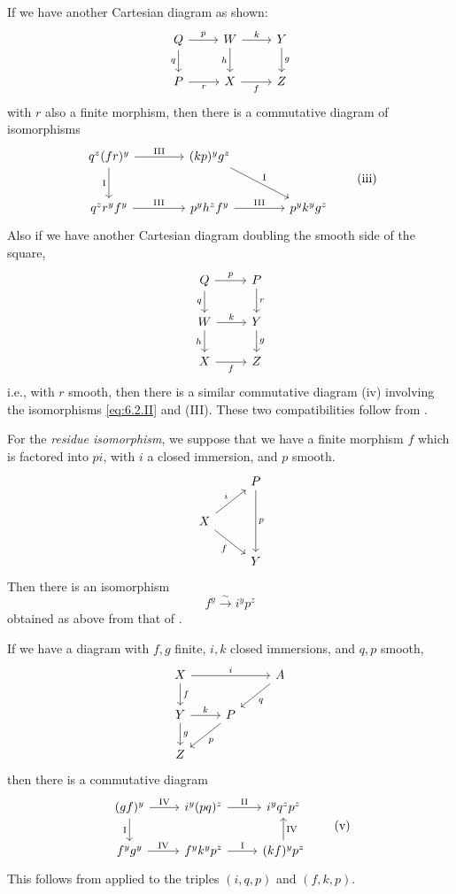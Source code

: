If we have another Cartesian diagram as shown:
\[
\begin{tikzcd}
	Q \arrow[r, "p"] \arrow[d, "q"'] & W \arrow[r, "k"] \arrow[d, "h"'] & Y \arrow[d, "g"] \\
	P \arrow[r, "r"'] & X \arrow[r, "f"'] & Z
\end{tikzcd}
\]
with $r$ also a finite morphism, then there is a commutative diagram of isomorphisms
\[
\begin{tikzcd}[row sep=2.5em, column sep=4em]
	q^z(fr)^y
	\arrow[r, "\text{III}"]
	\arrow[d, "\text{I}"']
	& (kp)^y g^z
	\arrow[dr, "\text{I}"] \\
	q^z r^y f^y
	\arrow[r, "\text{III}"]
	& p^y h^z f^y
	\arrow[r, "\text{III}"]
	& p^y k^y g^z
\end{tikzcd}
\tag{iii}\label{eq:6.2.iii}
\]
\label{compat:6.2.iv}
Also if we have another Cartesian diagram doubling the smooth side of the square,
\[
\begin{tikzcd}
	Q \arrow[r, "p"] \arrow[d, "q"'] & P \arrow[d, "r"] \\
	W \arrow[r, "k"] \arrow[d, "h"'] & Y \arrow[d, "g"] \\
	X \arrow[r, "f"'] & Z
\end{tikzcd}
\]
i.e., with $r$ smooth, then there is a similar commutative diagram (iv) involving the isomorphisms \eqref{eq:6.2.II} and (III). These two compatibilities follow from .

For the \emph{residue isomorphism}, we suppose that we have a finite morphism $f$ which is factored into $pi$, with $i$ a closed immersion, and $p$ smooth.
\[
\begin{tikzcd}
	& P \arrow[dd, "p"] \\
	X \arrow[ur, "i"] \arrow[dr, "f"'] & \\
	& Y
\end{tikzcd}
\]
Then there is an isomorphism
\[
f^{y} \xrightarrow{\sim} i^{y}p^{z} \tag{IV}\label{eq:6.2.IV}
\]
obtained as above from that of .

If we have a diagram with $f,g$ finite, $i,k$ closed immersions, and $q,p$ smooth,
\[
\begin{tikzcd}
X\arrow[rr, "i"] \arrow[d, "f"]&&A\arrow[dl, "q"]\\
Y\arrow[r, "k"] \arrow[d, "g"]&P\arrow[dl, "p"]\\
Z
\end{tikzcd}
\]
then there is a commutative diagram
\[
\begin{tikzcd}
(gf)^{y} \ar[r,"\mathrm{IV}"] \ar[d,"\mathrm{I}"'] & i^{y}(pq)^{z} \ar[r,"\mathrm{II}"] & i^{y}q^{z}p^{z} \\
f^{y}g^{y} \ar[r,"\mathrm{IV}"] & f^{y}k^{y}p^{z} \ar[r,"\mathrm{I}"] & (kf)^{y}p^{z} \ar[u,"\mathrm{IV}"']
\end{tikzcd}
\tag{v}\label{eq:6.2.v}
\]
This follows from  applied to the triples $(i,q,p)$ and $(f,k,p)$.

